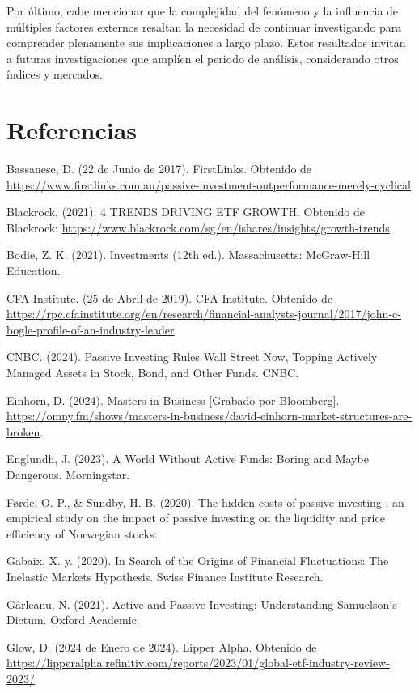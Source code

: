 \documentclass[12pt,a4paper]{article}
\begin{document}
Por último, cabe mencionar que la complejidad del fenómeno y la influencia de múltiples factores externos resaltan la necesidad de continuar investigando para comprender plenamente sus implicaciones a largo plazo. Estos resultados invitan a futuras investigaciones que amplíen el periodo de análisis, considerando otros índices y mercados.

\newpage

\section{Referencias}

\noindent
Bassanese, D. (22 de Junio de 2017). FirstLinks. Obtenido de \url{https://www.firstlinks.com.au/passive-investment-outperformance-merely-cyclical}

\noindent
Blackrock. (2021). 4 TRENDS DRIVING ETF GROWTH. Obtenido de Blackrock: \url{https://www.blackrock.com/sg/en/ishares/insights/growth-trends}

\noindent
Bodie, Z. K. (2021). Investments (12th ed.). Massachusetts: McGraw-Hill Education.

\noindent
CFA Institute. (25 de Abril de 2019). CFA Institute. Obtenido de \url{https://rpc.cfainstitute.org/en/research/financial-analysts-journal/2017/john-c-bogle-profile-of-an-industry-leader}

\noindent
CNBC. (2024). Passive Investing Rules Wall Street Now, Topping Actively Managed Assets in Stock, Bond, and Other Funds. CNBC.

\noindent
Einhorn, D. (2024). Masters in Business [Grabado por Bloomberg]. \url{https://omny.fm/shows/masters-in-business/david-einhorn-market-structures-are-broken}.

\noindent
Englundh, J. (2023). A World Without Active Funds: Boring and Maybe Dangerous. Morningstar.

\noindent
Førde, O. P., \& Sundby, H. B. (2020). The hidden costs of passive investing : an empirical study on the impact of passive investing on the liquidity and price efficiency of Norwegian stocks.

\noindent
Gabaix, X. y. (2020). In Search of the Origins of Financial Fluctuations: The Inelastic Markets Hypothesis. Swiss Finance Institute Research.

\noindent
Gârleanu, N. (2021). Active and Passive Investing: Understanding Samuelson's Dictum. Oxford Academic.

\noindent
Glow, D. (2024 de Enero de 2024). Lipper Alpha. Obtenido de \url{https://lipperalpha.refinitiv.com/reports/2023/01/global-etf-industry-review-2023/}
\end{document}

